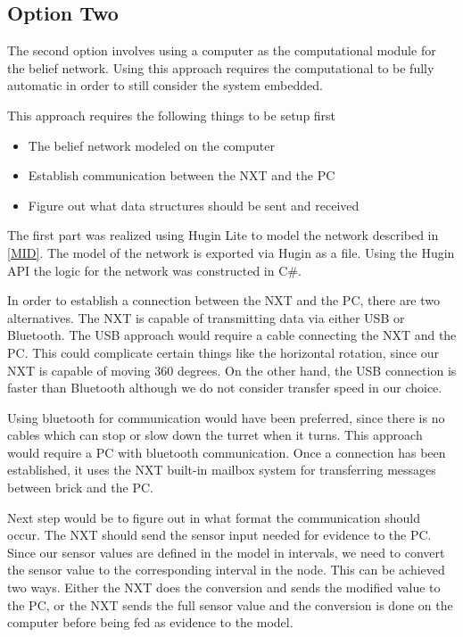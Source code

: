 \subsection{Option Two}
The second option involves using a computer as the computational module for the
belief network. Using this approach requires the computational to be fully
automatic in order to still consider the system embedded.

This approach requires the following things to be setup first
\begin{itemize}
\item The belief network modeled on the computer
\item Establish communication between the NXT and the PC
\item Figure out what data structures should be sent and received
\end{itemize}

The first part was realized using Hugin Lite to model the network described
in \autoref{MID}. The model of the network is exported via Hugin as a file.
Using the Hugin API the logic for the network was constructed in C\#.\nl

In order to establish a connection between the NXT and the PC, there are two
alternatives. The NXT is capable of transmitting data via either USB or
Bluetooth.
The USB approach would require a cable connecting the NXT and the PC. This could
complicate certain things like the horizontal rotation, since our NXT is capable
of moving 360 degrees. On the other hand, the USB connection is faster than
Bluetooth although we do not consider transfer speed in our choice.\nl

Using bluetooth for communication would have been preferred, since there is
no cables which can stop or slow down the turret when it turns. 
This approach would require a PC with bluetooth communication. Once a connection has
been established, it uses the NXT built-in mailbox system for transferring
messages between brick and the PC.\nl

Next step would be to figure out in what format the communication should occur.
The NXT should send the sensor input needed for evidence to the PC. Since our
sensor values are defined in the model in intervals, we need to convert the
sensor value to the corresponding interval in the node. This can be achieved two ways. Either
the NXT does the conversion and sends the modified value to the PC, or the NXT
sends the full sensor value and the conversion is done on the computer before
being fed as evidence to the model.\nl

